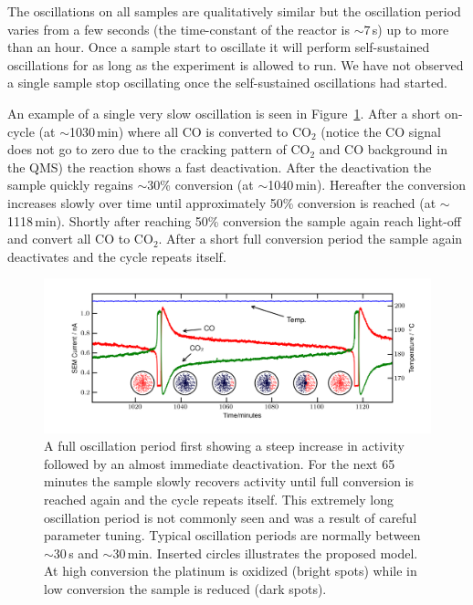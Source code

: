 \documentclass[8.5pt,twoside,twocolumn]{article}
\begin{document}
The oscillations on all samples are qualitatively similar but the oscillation period varies from a few seconds (the time-constant of the reactor is $\sim7\,$s) up to more than an hour. Once a sample start to oscillate it will perform self-sustained oscillations for as long as the experiment is allowed to run. We have not observed a single sample stop oscillating once the self-sustained oscillations had started. 

An example of a single very slow oscillation is seen in Figure~\ref{fgr:full_oscillation}. After a short on-cycle (at $\sim$1030\,min) where all CO is converted to CO$_2$ (notice the CO signal does not go to zero due to the cracking pattern of CO$_2$ and CO background in the QMS) the reaction shows a fast deactivation. After the deactivation the sample quickly regains $\sim$30\% conversion (at $\sim$1040\,min). Hereafter the conversion increases slowly over time until approximately 50\% conversion is reached (at $\sim$1118\,min). Shortly after reaching 50\% conversion the sample again reach light-off and convert all CO to CO$_2$. After a short full conversion period the sample again deactivates and the cycle repeats itself.
\begin{figure}
  \centering
  \includegraphics[width=17cm]{single_full_oscillation.png}
  \caption{A full oscillation period first showing a steep increase in activity followed by an almost immediate deactivation. For the next 65 minutes the sample slowly recovers activity until full conversion is reached again and the cycle repeats itself. This extremely long oscillation period is not commonly seen and was a result of careful parameter tuning. Typical oscillation periods are normally between $\sim$30\,s and $\sim$30\,min. Inserted circles illustrates the proposed model. At high conversion the platinum is oxidized (bright spots) while in low conversion the sample is reduced (dark spots).}
  \label{fgr:full_oscillation}
\end{figure}
\end{document}
